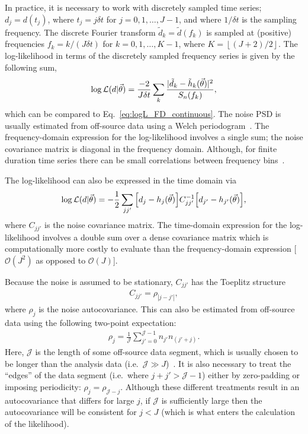In practice, it is necessary to work with discretely sampled time series; $d_j = d(t_j)$, where $t_j=j\delta t$ for $j=0,1,\ldots, J-1$, and where $1/\delta t$ is the sampling frequency.
The discrete Fourier transform $\tilde{d}_k = \tilde{d}(f_k)$ is sampled at (positive) frequencies $f_k=k/(J\delta t)$ for $k=0,1,\ldots,K-1$, where $K=\left \lfloor (J+2)/2\right \rfloor$.
The log-likelihood in terms of the discretely sampled frequency series is given by the following sum,
\begin{align} \label{eq:logL_FD_discrete}
	\log\mathcal{L}(d|\vec{\theta}) = \frac{-2}{J\delta t}\sum_{k}\frac{|\tilde{d}_k-\tilde{h}_k(\vec{\theta})|^2}{S_n(f_k)},
\end{align}
which can be compared to Eq.~\ref{eq:logL_FD_continuous}.
The noise PSD is usually estimated from off-source data using a Welch periodogram~\cite{1161901}.
The frequency-domain expression for the log-likelihood involves a single sum; the noise covariance matrix is diagonal in the frequency domain.
Although, for finite duration time series there can be small correlations between frequency bins~\cite{Talbot:2021igi}.

The log-likelihood can also be expressed in the time domain via
\begin{align} \label{eq:logL_TD_discrete}
	\log\mathcal{L}(d|\vec{\theta}) = -\frac{1}{2}\sum_{jj'}\qty[d_j-h_j(\vec{\theta})] C^{-1}_{jj'} \qty[d_{j'}-h_{j'}(\vec{\theta})],
\end{align}
where $C_{jj'}$ is the noise covariance matrix.
The time-domain expression for the log-likelihood involves a double sum over a dense covariance matrix which is computationally more costly to evaluate than the frequency-domain expression [$\mathcal{O}(J^2)$ as opposed to $\mathcal{O}(J)$].

Because the noise is assumed to be stationary, $C_{jj'}$ has the Toeplitz structure
\begin{align} \label{eq:Toeplitz}
	C_{jj'} = \rho_{|j-j'|},
\end{align} 
where $\rho_j$ is the noise autocovariance. 
This can also be estimated from off-source data using the following two-point expectation:
\begin{align} \label{eq:autocovariance}
	\rho_j = \frac{1}{\mathcal{J}}\sum_{j'=0}^{\mathcal{J}-1}n_{j'}n_{(j'+j)}.
\end{align}
Here, $\mathcal{J}$ is the length of some off-source data segment, which is usually chosen to be longer than the analysis data (i.e.\ $\mathcal{J} \gg J$)~\cite{Isi:2021iql}.
It is also necessary to treat the ``edges'' of the data segment (i.e.\ where $j + j' > \mathcal{J}-1$) either by zero-padding or imposing periodicity: $\rho_j = \rho_{\mathcal{J}-j}$.
Although these different treatments result in an autocovariance that differs for large $j$, if $\mathcal{J}$ is sufficiently large then the autocovariance will be consistent for $j < J$ (which is what enters the calculation of the likelihood).

